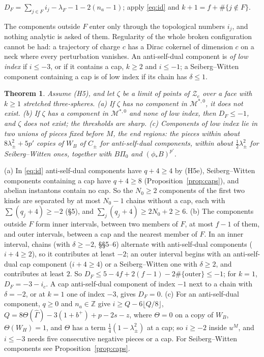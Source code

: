 \documentclass[10pt]{amsart}
\makeatletter
\numberwithin{equation}{section}
\theoremstyle{compact}
\newtheorem{theorem}{Theorem}[section]
\renewenvironment{proof}[1][\proofname]{\par\pushQED{\qed}\normalfont
  \topsep4\p@\relax\trivlist\item[\hskip\labelsep\itshape#1\@addpunct{.}]%
  \ignorespaces}{\popQED\endtrivlist\@endpefalse}
\newcommand{\Z}{\mathbb Z}
\newcommand{\cM}{\mathcal M}
\newcommand{\cZ}{\mathcal Z}
\newcommand{\Ms}{\cM^{*,0}}
\makeatother
\begin{document}
\begin{proof}
$D_F=\sum_{j\in F}i_j-\lambda_F-1-2(n_a-1)$; apply \eqref{eq:id} and
$k+1=f+\#\{j\notin F\}$.
\end{proof}

The components outside $F$ enter only through the topological numbers $i_j$,
and nothing analytic is asked of them. Regularity of the whole broken
configuration cannot be had: a trajectory of charge $c$ has a Dirac cokernel of
dimension $c$ on a neck where every perturbation vanishes. An anti-self-dual
component is \emph{of low index} if $i\le-3$, or if it contains a cap, $k\ge2$
and $i\le-1$; a Seiberg--Witten component containing a cap is of low index if
its chain has $\delta\le1$.

\begin{theorem}\label{thm:J}
Assume \textup{(H5)}, and let $\zeta$ be a limit of points of $\cZ_e$ over a face
with $k\ge1$ stretched three-spheres. \textup{(a)} If $\zeta$ has no component
in $\Ms$, it does not exist. \textup{(b)} If $\zeta$ has a component in $\Ms$
and none of low index, then $D_F\le-1$, and $\zeta$ does not exist; the
thresholds are sharp. \textup{(c)} Components of low index lie in two unions of
pieces fixed
before $M$, the \emph{end regions}: the pieces within about
$8\lambda_\pm^2+5p'$ copies of $W_B$ of $C_\pm$ for anti-self-dual components,
within about $\frac12\lambda_\pm^2$ for Seiberg--Witten ones, together with
$B\Pi_0$ and $(\phi_*B)^{p'}$.
\end{theorem}

\begin{proof}[Sketch]
(a) In \eqref{eq:id} anti-self-dual components have $q+4\ge4$ by (H5e),
Seiberg--Witten components containing a cap have $q+4\ge8$
(Proposition~\ref{prop:caps}), and abelian instantons contain no cap. So the
$N_0\ge2$ components of the first two kinds are separated by at most $N_0-1$
chains without a cap, each with $\sum(q_j+4)\ge-2$ (\S5), and
$\sum_j(q_j+4)\ge2N_0+2\ge6$. (b) The components outside $F$ form inner
intervals, between two members of $F$, at most $f-1$ of them, and outer
intervals, between a cap and the nearest member of $F$. In an inner interval,
chains (with $\delta\ge-2$, \S\S5--6) alternate with anti-self-dual components
($i+4\ge2$), so it contributes at least $-2$; an outer interval begins with an
anti-self-dual cap component ($i+4\ge4$) or a Seiberg--Witten one with
$\delta\ge2$, and contributes at least $2$. So
$D_F\le5-4f+2(f-1)-2\#\{\text{outer}\}\le-1$; for $k=1$, $D_F=-3-i_c$. A cap
anti-self-dual component of index $-1$ next to a chain with $\delta=-2$, or at
$k=1$ one of index $-3$, gives $D_F=0$. (c) For
an anti-self-dual component, $q\ge0$ and $n_a\in\Z$ give $i\ge
Q-6\lfloor Q/8\rfloor$, $Q=8\Theta(\hat\Gamma)-3(1+b^+)+p-2s-z$, where
$\Theta=0$ on a copy of $W_B$, $\Theta(W_H)=1$, and $\Theta$ has a term
$\frac14(1-\lambda_\pm^2)$ at a cap; so $i\ge-2$ inside $u^M$, and $i\le-3$
needs five consecutive negative pieces or a cap. For Seiberg--Witten components
see Proposition~\ref{prop:caps}.
\end{proof}
\end{document}
